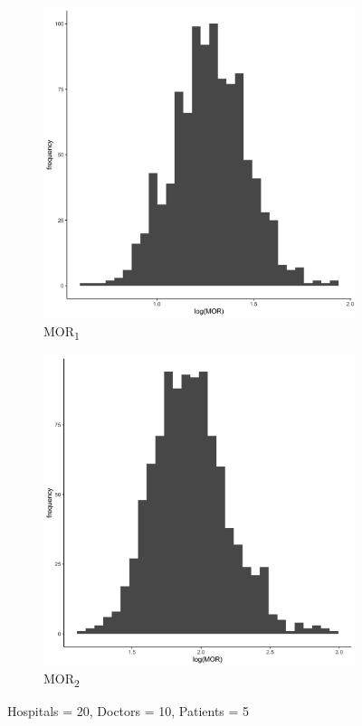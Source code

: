 \documentclass[
  letterpaper,
  DIV=11,
  numbers=noendperiod,
  titlepage]{scrartcl}
\begin{document}
\begin{figure}
\centering
\begin{subfigure}{.49\textwidth}
    \centering
    \includegraphics[width=.95\linewidth]{../../plots/three-lvl-ran-int/high-prev/hist_20_10_5_three_lvl_high_prev_mor1.png}  
    \caption{MOR\textsubscript{1}}
    \label{l20m10n51}
\end{subfigure}
\begin{subfigure}{.49\textwidth}
    \centering
    \includegraphics[width=.95\linewidth]{../../plots/three-lvl-ran-int/high-prev/hist_20_10_5_three_lvl_high_prev_mor2.png}  
    \caption{MOR\textsubscript{2}}
    \label{l20m10n52}
\end{subfigure}
\caption{Hospitals = 20, Doctors = 10, Patients = 5}
\label{mor1}
\end{figure}
\end{document}
